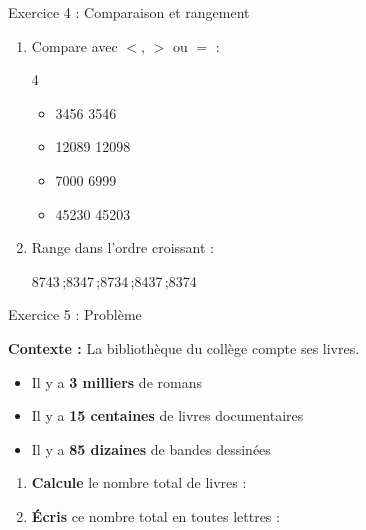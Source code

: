 \begin{exercisebox}{ Exercice 4 : Comparaison et rangement }
  \begin{enumerate}[label=\textcolor{primary}{\textbf{\alph*)}},leftmargin=*]
    \item Compare avec $<$, $>$ ou $=$ : 
    \begin{multicols}{4}
      \begin{itemize}[label=$\bullet$]
        \item \num{3456} \ans{$<$} \num{3546}
        \item \num{12089} \ans{$<$} \num{12098}
        \item \num{7000} \ans{$>$} \num{6999}
        \item \num{45230} \ans{$>$} \num{45203}
      \end{itemize}
    \end{multicols}
    \item Range dans l'ordre croissant : 
    \begin{center}
      \num{8743}\,;\quad \num{8347}\,;\quad \num{8734}\,;\quad \num{8437}\,;\quad \num{8374}
    \end{center}
  \end{enumerate}
\end{exercisebox}

\begin{exercisebox}{ Exercice 5 : Problème }
  \begin{tcolorbox}[colback=blue!5,colframe=primary!30,arc=2mm,boxrule=0.5pt]
    \textbf{Contexte :} La bibliothèque du collège compte ses livres.
    \begin{itemize}[noitemsep,topsep=5pt]
      \item Il y a \textbf{3 milliers} de romans
      \item Il y a \textbf{15 centaines} de livres documentaires
      \item Il y a \textbf{85 dizaines} de bandes dessinées
    \end{itemize}
  \end{tcolorbox}

  \begin{enumerate}[leftmargin=*]
    \item \textbf{Calcule} le nombre total de livres : 
    \item \textbf{Écris} ce nombre total en toutes lettres : 
  \end{enumerate}
\end{exercisebox}

